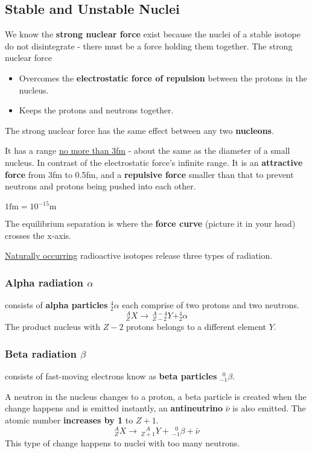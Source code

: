 \subsection{Stable and Unstable Nuclei}

We know the \textbf{strong nuclear force} exist because the nuclei of a stable isotope do not disintegrate - there must be a force holding them together. The strong nuclear force
\begin{itemize}
    \item Overcomes the \textbf{electrostatic force of repulsion} between the protons in the nucleus.
    \item Keeps the protons and neutrons together.
\end{itemize}

The strong nuclear force has the same effect between any two \textbf{nucleons}.

It has a range \underline{no more than 3fm} - about the same as the diameter of a small nucleus. In contrast of the electrostatic force's infinite range. It is an \textbf{attractive force} from 3fm to 0.5fm, and a \textbf{repulsive force} smaller than that to prevent neutrons and protons being pushed into each other.

$1\text{fm}=10^{-15}\text{m}$

The equilibrium separation is where the \textbf{force curve} (picture it in your head) crosses the x-axis.

\underline{Naturally occurring} radioactive isotopes release three types of radiation.

\subsubsection*{Alpha radiation $\alpha$}
consists of \textbf{alpha particles} $^4_2\alpha$ each comprise of two protons and two neutrons.
$$^A_ZX\to\,^{A-4}_{Z-2}Y+^4_2\alpha$$
The product nucleus with $Z-2$ protons belongs to a different element $Y$.

\subsubsection*{Beta radiation $\beta$}
consists of fast-moving electrons know as \textbf{beta particles} $^{\hspace{6pt}0}_{-1}\beta$.

A neutron in the nucleus changes to a proton, a beta particle is created when the change happens and is emitted instantly, an \textbf{antineutrino} $\bar\nu$ is also emitted. The atomic number \textbf{increases by 1} to $Z+1$.
$$^A_ZX\to\,^{\hspace{10pt}A}_{Z+1}Y+\,^{\hspace{6pt}0}_{-1}\beta+\bar\nu$$
This type of change happens to nuclei with too many neutrons.

